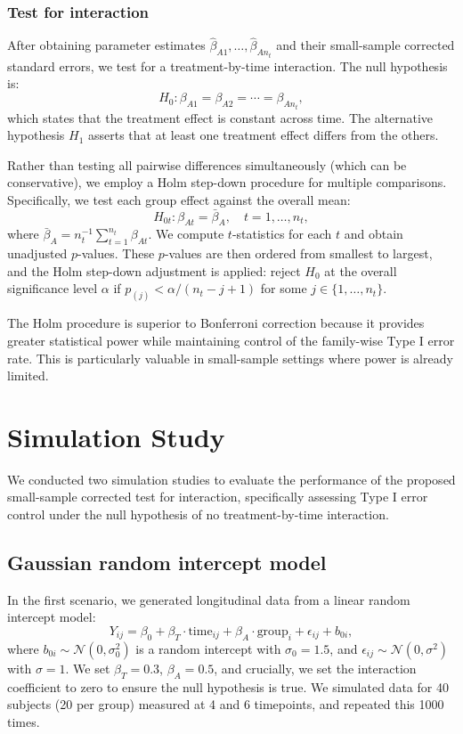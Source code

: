 \documentclass[alpha-refs]{wiley-article}
\begin{document}
\subsubsection{Test for interaction}

After obtaining parameter estimates $\hat{\beta}_{A1}, \ldots, \hat{\beta}_{An_t}$ and their small-sample corrected standard errors, we test for a treatment-by-time interaction. The null hypothesis is:
\[
H_0: \beta_{A1} = \beta_{A2} = \cdots = \beta_{An_t},
\]
which states that the treatment effect is constant across time. The alternative hypothesis $H_1$ asserts that at least one treatment effect differs from the others.

Rather than testing all pairwise differences simultaneously (which can be conservative), we employ a Holm step-down procedure for multiple comparisons. Specifically, we test each group effect against the overall mean:
\[
H_{0t}: \beta_{At} = \bar{\beta}_A, \quad t = 1, \ldots, n_t,
\]
where $\bar{\beta}_A = n_t^{-1} \sum_{t=1}^{n_t} \beta_{At}$. We compute $t$-statistics for each $t$ and obtain unadjusted $p$-values. These $p$-values are then ordered from smallest to largest, and the Holm step-down adjustment is applied: reject $H_0$ at the overall significance level $\alpha$ if $p_{(j)} < \alpha / (n_t - j + 1)$ for some $j \in \{1, \ldots, n_t\}$.

The Holm procedure is superior to Bonferroni correction because it provides greater statistical power while maintaining control of the family-wise Type I error rate. This is particularly valuable in small-sample settings where power is already limited.

\section{Simulation Study}
\label{sim}

We conducted two simulation studies to evaluate the performance of the proposed small-sample corrected test for interaction, specifically assessing Type I error control under the null hypothesis of no treatment-by-time interaction.

\subsection{Gaussian random intercept model}

In the first scenario, we generated longitudinal data from a linear random intercept model:
\[
Y_{ij} = \beta_0 + \beta_T \cdot \text{time}_{ij} + \beta_A \cdot \text{group}_{i} + \epsilon_{ij} + b_{0i},
\]
where $b_{0i} \sim \mathcal{N}(0, \sigma_0^2)$ is a random intercept with $\sigma_0 = 1.5$, and $\epsilon_{ij} \sim \mathcal{N}(0, \sigma^2)$ with $\sigma = 1$. We set $\beta_T = 0.3$, $\beta_A = 0.5$, and crucially, we set the interaction coefficient to zero to ensure the null hypothesis is true. We simulated data for 40 subjects (20 per group) measured at 4 and 6 timepoints, and repeated this 1000 times.
\end{document}
